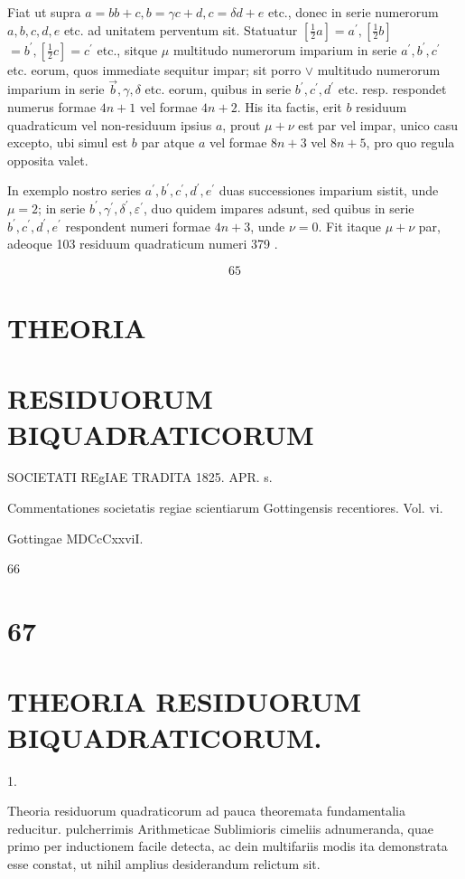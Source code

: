 \documentclass[10pt]{article}
\begin{document}
Fiat ut supra \(a=b b+c, b=\gamma c+d, c=\delta d+e\) etc., donec in serie numerorum \(a, b, c, d, e\) etc. ad unitatem perventum sit. Statuatur \(\left[\frac{1}{2} a\right]=a^{\prime},\left[\frac{1}{2} b\right]\) \(=b^{\prime},\left[\frac{1}{2} c\right]=c^{\prime}\) etc., sitque \(\mu\) multitudo numerorum imparium in serie \(a^{\prime}, b^{\prime}, c^{\prime}\) etc. eorum, quos immediate sequitur impar; sit porro \(\vee\) multitudo numerorum imparium in serie \(\vec{b}, \gamma, \delta\) etc. eorum, quibus in serie \(b^{\prime}, c^{\prime}, d^{\prime}\) etc. resp. respondet numerus formae \(4 n+1\) vel formae \(4 n+2\). His ita factis, erit \(b\) residuum quadraticum vel non-residuum ipsius \(a\), prout \(\mu+\nu\) est par vel impar, unico casu excepto, ubi simul est \(b\) par atque \(a\) vel formae \(8 n+3\) vel \(8 n+5\), pro quo regula opposita valet.

In exemplo nostro series \(a^{\prime}, b^{\prime}, c^{\prime}, d^{\prime}, e^{\prime}\) duas successiones imparium sistit, unde \(\mu=2\); in serie \(b^{\prime}, \gamma^{\prime}, \delta^{\prime}, \varepsilon^{\prime}\), duo quidem impares adsunt, sed quibus in serie \(b^{\prime}, c^{\prime}, d^{\prime}, e^{\prime}\) respondent numeri formae \(4 n+3\), unde \(\nu=0\). Fit itaque \(\mu+\nu\) par, adeoque 103 residuum quadraticum numeri 379 .

\[
65
\]

\section*{THEORIA }
\section*{RESIDUORUM BIQUADRATICORUM}
SOCIETATI REgIAE TRADITA 1825. APR. s.

Commentationes societatis regiae scientiarum Gottingensis recentiores. Vol. vi.

Gottingae MDCcCxxviI.

66

\section*{67 }
\section*{THEORIA RESIDUORUM BIQUADRATICORUM.}


1.

Theoria residuorum quadraticorum ad pauca theoremata fundamentalia reducitur. pulcherrimis Arithmeticae Sublimioris cimeliis adnumeranda, quae primo per inductionem facile detecta, ac dein multifariis modis ita demonstrata esse constat, ut nihil amplius desiderandum relictum sit.
\end{document}
